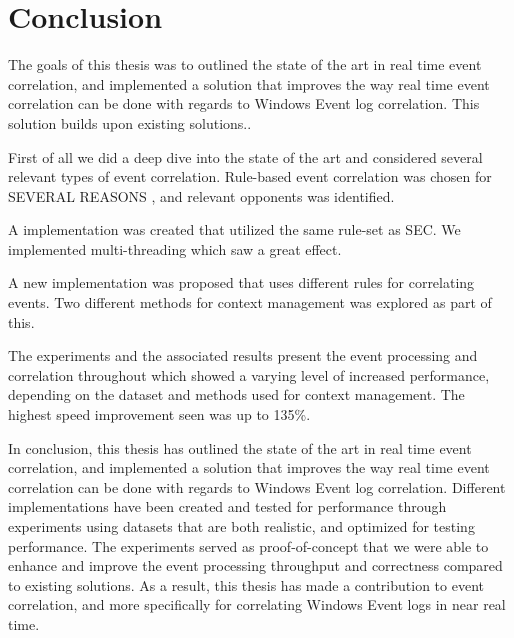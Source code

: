 \chapter{Conclusion}
\label{chap:conclusion}

\iffalse
Minioppsummering, med fokus på konsekvenser, konkludere om du har besvart RQ.

Her skal det ikke introduseres noe nytt! Trekker sammen de viktige tingene til slutt.

Inneholder også future work, her kan du utdype litt, men ingenting "nytt" her.
\fi
The goals of this thesis was to outlined the state of the art in real time event correlation, and implemented a solution that improves the way real time event correlation can be done with regards to Windows Event log correlation. This solution builds upon existing solutions.. 

First of all we did a deep dive into the state of the art and considered several relevant types of event correlation. Rule-based event correlation was chosen for SEVERAL REASONS , and relevant opponents was identified. 

A implementation was created that utilized the same rule-set as SEC. We implemented multi-threading which saw a great effect. 

A new implementation was proposed that uses different rules for correlating events. Two different methods for context management was explored as part of this. 

The experiments and the associated results present the event processing and correlation throughout which showed a varying level of increased performance, depending on the dataset and methods used for context management. The highest speed improvement seen was up to 135\%. 

In conclusion, this thesis has outlined the state of the art in real time event correlation, and implemented a solution that improves the way real time event correlation can be done with regards to Windows Event log correlation.
Different implementations have been created and tested for performance through experiments using datasets that are both realistic, and optimized for testing performance. The experiments served as proof-of-concept that we were able to enhance and improve the event processing throughput and correctness compared to existing solutions. As a result, this thesis has made a contribution to event correlation, and more specifically for correlating Windows Event logs in near real time.
